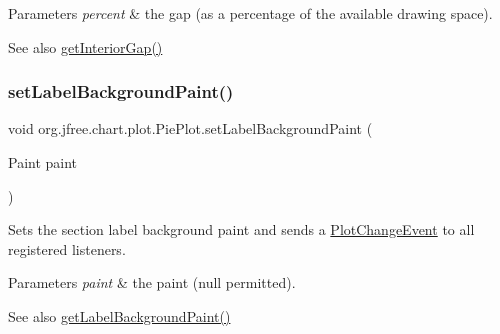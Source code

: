 \begin{DoxyParams}{Parameters}
{\em percent} & the gap (as a percentage of the available drawing space).\\
\hline
\end{DoxyParams}
\begin{DoxySeeAlso}{See also}
\mbox{\hyperlink{classorg_1_1jfree_1_1chart_1_1plot_1_1_pie_plot_a15a41ce0f9505c82aa6f935e10886e8e}{get\+Interior\+Gap()}} 
\end{DoxySeeAlso}
\mbox{\label{classorg_1_1jfree_1_1chart_1_1plot_1_1_pie_plot_a649f6e9bb10b1b0ce48910e2aae15ed1}} 
\subsubsection{\texorpdfstring{set\+Label\+Background\+Paint()}{setLabelBackgroundPaint()}}
{\footnotesize\ttfamily void org.\+jfree.\+chart.\+plot.\+Pie\+Plot.\+set\+Label\+Background\+Paint (\begin{DoxyParamCaption}\item[{Paint}]{paint }\end{DoxyParamCaption})}

Sets the section label background paint and sends a \mbox{\hyperlink{}{Plot\+Change\+Event}} to all registered listeners.


\begin{DoxyParams}{Parameters}
{\em paint} & the paint ({\ttfamily null} permitted).\\
\hline
\end{DoxyParams}
\begin{DoxySeeAlso}{See also}
\mbox{\hyperlink{classorg_1_1jfree_1_1chart_1_1plot_1_1_pie_plot_a72c8c0c1dd775a541ceee105c9611e7f}{get\+Label\+Background\+Paint()}} 
\end{DoxySeeAlso}
\mbox{\label{classorg_1_1jfree_1_1chart_1_1plot_1_1_pie_plot_a8f4cdc293e6bfea16c6ac91daa60c22f}} 
